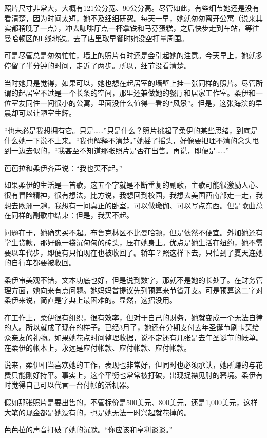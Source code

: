 照片尺寸非常大，大概有121公分宽、90公分高。尽管如此，有些细节她还是没有看清楚，因为时间太短，她不及细细研究。每天一早，她就匆匆离开公寓（说来其实都稍晚了一点），冲去咖啡厅点一杯拿铁和马芬蛋糕，之后快步走到车站，等往曼哈顿区的L线地铁。去了店里取早餐时她没空打量周围。

可是尽管总是匆匆忙忙，墙上的照片有时还是会引起她的注意。今天早上，她就多停留了半分钟的时间，走近了两步。所以，细节没看清楚。

当时她只是觉得，如果可以，她也想在起居室的墙壁上挂一张同样的照片。尽管所谓的起居室不过是一个长条的空间，那里还兼做她的餐厅和居家工作室。柔伊和一位室友同住一间很小的公寓，里面没什么值得一看的“风景”。但是，这张海滨的早晨却可以让陋室生辉。

“也未必是我想拥有它。只是……”只是什么？照片挑起了柔伊的某些思绪，到底是什么她一下说不上来。“我也解释不清楚。”她摇了摇头，好像要把理不清的念头甩到一边去似的，“我甚至不知道那张照片是否在出售。再说，即便是……”

芭芭拉和柔伊齐声说：“我也买不起。”

如果柔伊的生活是一首歌，这五个字就是不断重复的副歌，主歌可能很激励人心、很有冒险精神，很有想法，比方说，我想回到校园，我想去美国西南部走一走，我想去欧洲一趟，我想有一间真正的卧室，可以做瑜伽、可以写点东西。但是歌曲总在同样的副歌中结束：但是，我买不起。

问题在于，她确实买不起。布鲁克林区不比曼哈顿，但是依然不便宜。外加她还有学生贷款，那好像一袋沉甸甸的砖头，压在她身上。优点是她生活在纽约，她不需要以车代步，即便有只怕现在也被收回了。轿车？照这样下去，只怕到了夏天连她的自行车都要被收回。

柔伊审美观不错，文本功底也好，但是说到数字，那就不是她的长处了。在财务管理方面，她向来有点问题。她妈妈曾提议先列预算来节省开支。可是预算这二字对柔伊来说，简直是字典上最困难的。显然，这招没用。

在工作上，柔伊很有组织，很有效率，但对于自己的财务，她就变成一个无法自律的人。所以就成了现在的样子。已经3月了，她还在分期支付去年圣诞节刷卡买给众亲友的礼物。如果她花点时间整理收据，说不定还有几张是去年圣诞节的帐单。在柔伊的帐本上，永远是应付帐款、应付帐款、应付帐款。

说来，柔伊相当喜欢她的工作，表现也非常好，但同时也必须承认，她所赚的与花费只能刚好持平。事实上，这个平衡也常常被打破，出现捉襟见肘的窘境。柔伊有时觉得自己可以代言一台付帐的活机器。

假如那张照片是要出售的，不管标价是500美元、800美元，还是1,000美元，这样大笔的现金都是她没有的，也是她无法一时兴起就花掉的。

芭芭拉的声音打破了她的沉默。“你应该和亨利谈谈。”

